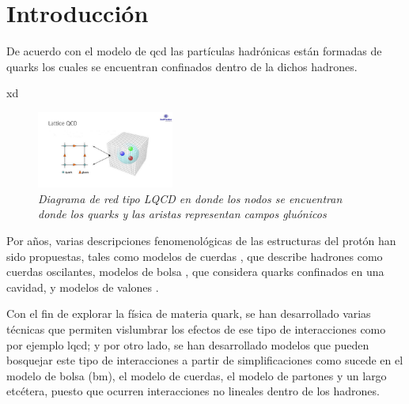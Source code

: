\chapter*{Introducción}

De acuerdo con el modelo de \acrfull{qcd} las partículas hadrónicas están formadas de quarks los cuales se encuentran confinados dentro de la dichos hadrones.

xd

\begin{figure}
\centering
\includegraphics[width=0.4\textwidth]{./Images/LQCD.jpg}
\caption[Red LQCD]{\emph{Diagrama de red tipo LQCD en donde los nodos se encuentran donde los quarks y las aristas representan campos gluónicos}}
\label{fig: LQCD}
\end{figure}

Por años, varias descripciones fenomenológicas de las estructuras del protón han sido propuestas, tales como modelos de cuerdas \cite{Artru1974, Andersson_1983} \cite{Artru1974, Andersson_1983}, que describe hadrones como cuerdas oscilantes, modelos de bolsa \cite{AIHPA_1968__8_2_163_0,DeTar_1983}, que considera quarks confinados en una cavidad, y modelos de valones \cite{Hwa_1981}.

Con el fin de explorar la física de materia quark, se han desarrollado varias técnicas que permiten vislumbrar los efectos de ese tipo de interacciones como por ejemplo \acrfull{lqcd}; y por otro lado, se han desarrollado modelos que pueden bosquejar este tipo de interacciones a partir de simplificaciones como sucede en el modelo de bolsa (\acrfull{bm}), el modelo de cuerdas, el modelo de partones y un largo etcétera\cite{DeTar_1983}, puesto que ocurren interacciones no lineales dentro de los hadrones. 


